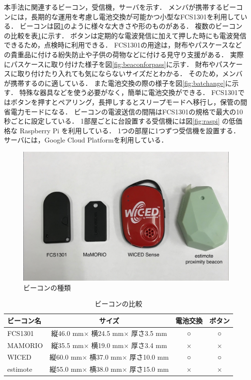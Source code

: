 本手法に関連するビーコン，受信機，サーバを示す．
メンバが携帯するビーコンには，長期的な運用を考慮し電池交換が可能かつ小型なFCS1301\cite{fcs1301}を利用している．
ビーコンは図\ref{fig:beacons}のように様々な大きさや形のものがある．
複数のビーコンの比較を表\ref{tb:beacons}に示す．
ボタンは定期的な電波発信に加えて押した時にも電波発信できるため，点検時に利用できる．
FCS1301の用途は，財布やパスケースなどの貴重品に付ける紛失防止や子供の荷物などに付ける見守り支援がある．
実際にパスケースに取り付けた様子を図\ref{fig:beaconforpass}に示す．
財布やパスケースに取り付けたり入れても気にならないサイズだとわかる．
そのため，メンバが携帯するのに適している．
また電池交換の際の様子を図\ref{fig:batchange}に示す．
特殊な器具などを使う必要がなく，簡単に電池交換ができる．
FCS1301ではボタンを押すとペアリング，長押しするとスリープモードへ移行し，保管の間省電力モードになる．
ビーコンの電波送信の間隔はFCS1301の規格で最大の10秒ごとに設定している．
1部屋ごとに台設置する受信機には図\ref{fig:raspi} の低価格な Raspberry Pi\cite{raspi} を利用している．
1つの部屋に1つずつ受信機を設置する．
サーバには，Google Cloud Platform\cite{gcp}を利用している．

\begin{figure}[H]
  \begin{center}
    \includegraphics[width=150mm]{image/beaconType.jpg}
    \caption{ビーコンの種類}
    \label{fig:beacons}
  \end{center}
\end{figure}

\begin{table}[H]
  \begin{center}
    \caption{ビーコンの比較}
    \label{tb:beacons}
    \begin{tabular}{|l|c|c|c|} \hline
      ビーコン名    & サイズ                           & 電池交換 & ボタン \\ \hline \hline
      FCS1301  & 縦46.0 mm× 横24.5 mm× 厚さ3.5 mm  & ○    & ○   \\
      MAMORIO  & 縦35.5 mm× 横19.0 mm× 厚さ3.4 mm  & ×    & ×   \\
      WICED    & 縦60.0 mm× 横37.0 mm× 厚さ10.0 mm & ○    & ○   \\
      estimote & 縦55.0 mm× 横38.0 mm× 厚さ15.0 mm & ×    & ×   \\\hline
    \end{tabular}
  \end{center}
\end{table}

